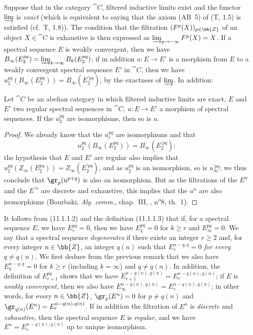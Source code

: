 \begin{env}[11.1.4]
\label{0.11.1.4}
Suppose that in the category $\cat{C}$, filtered inductive limits exist and the functor $\varinjlim$ is \emph{exact} (which is equivalent to saying that the axiom (AB~5) of (T, 1.5) is satisfied (cf.~T, 1.8)).
The condition that the filtration $(F^p(X))_{p\in\bb{Z}}$ of an object $X\in\cat{C}$ is exhaustive is then expressed as $\varinjlim_{p\to-\infty}F^p(X)=X$.
If a spectral sequence $E$ is weakly convergent, then we have $B_\infty(E_2^{pq})=\varinjlim_{k\to\infty}B_k(E_2^{pq})$; if in addition $u:E\to E'$ is a morphism from $E$ to a weakly convergent spectral sequence $E'$ in $\cat{C}$, then we have $u_2^{pq}(B_\infty(E_2^{pq}))=B_\infty(E_2^{\prime pq})$, by the exactness of $\varinjlim$.
In addition:
\end{env}

\begin{proposition}[11.1.5]
\label{0.11.1.5}
Let $\cat{C}$ be an abelian category in which filtered inductive limits are exact, $E$ and $E'$ two regular spectral sequences in $\cat{C}$, $u:E\to E'$ a morphism of spectral sequences.
If the $u_2^{pq}$ are isomorphisms, then so is $u$.
\end{proposition}

\begin{proof}
We already know  that the $u_r^{pq}$ are isomorphisms and that
\[
  u_2^{pq}(B_\infty(E_2^{pq}))=B_\infty(E_2^{\prime pq});
\]
the hypothesis that $E$ and $E'$ are regular also implies that $u_2^{pq}(Z_\infty(E_2^{pq}))=Z_\infty(E_2^{\prime pq})$, and as $u_2^{pq}$ is an isomorphism, so is $u_\infty^{\prime pq}$; we thus conclude that $\gr_p(u^{p+q})$ is also an isomorphism.
But as the filtrations of the $E^n$ and the $E^{\prime n}$ are discrete and exhaustive, this implies that the $u^n$ are also isomorphisms (Bourbaki, \emph{Alg. comm.}, chap.~III, , n\textsuperscript{o}8, th.~1).
\end{proof}

\begin{env}[11.1.6]
\label{0.11.1.6}
It follows from (11.1.1.2) and the definition (11.1.1.3) that if, for a spectral sequence $E$, we have $E_r^{pq}=0$, then we have $E_k^{pq}=0$ for $k\geq r$ and $E_\infty^{pq}=0$.
We say that a spectral sequence \emph{degenerates} if there exists an integer $r\geq 2$ and, for every integer $n\in\bb{Z}$, an integer $q(n)$ such that \emph{$E_r^{n-q,q}=0$ for every $q\neq q(n)$}.
We first deduce from the previous remark that we also have $E_k^{n-q,q}=0$ for $k\geq r$ (including $k=\infty$) and $q\neq q(n)$.
In addition, the definition of $E_{r+1}^{pq}$ shows that we have $E_{r+1}^{n-q(n),q(n)}=E_r^{n-q(n),q(n)}$; if $E$ is \emph{weakly convergent}, then we also have $E_\infty^{n-q(n),q(n)}=E_r^{n-q(n),q(n)}$; in other words, for every $n\in\bb{Z}$, $\gr_p(E^n)=0$ for $p\neq q(n)$ and $\gr_{q(n)}(E^n)=E_r^{n-q(n),q(n)}$.
If in addition the filtration of $E^n$ is \emph{discrete} and \emph{exhaustive}, then the spectral sequence $E$ is \emph{regular}, and we have $E^n=E_r^{n-q(n),q(n)}$ up to unique isomorphism.
\end{env}

